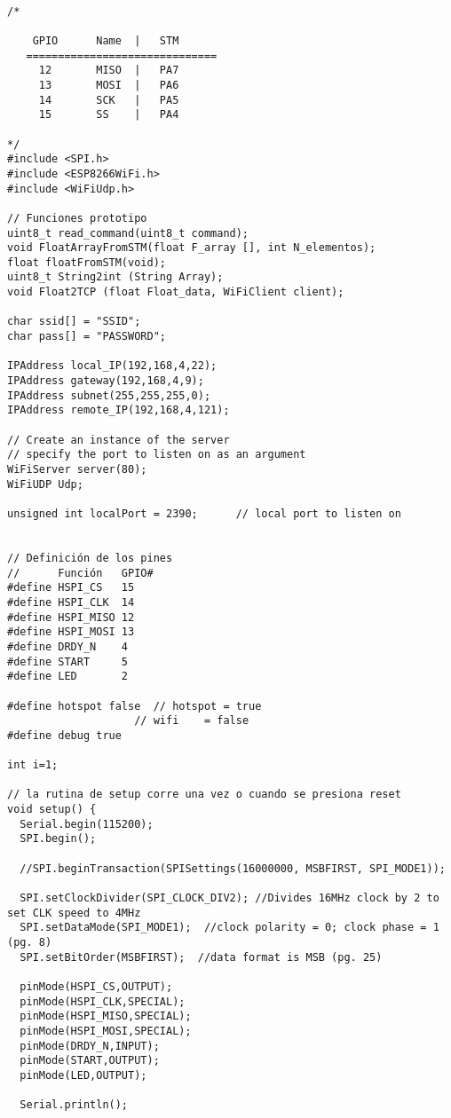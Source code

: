 \begin{lstlisting}[label=algoritmo:ESP:master_fast.ino,style = STM-code,frame=single,caption=ESP:master\_fast.ino]

/*

    GPIO      Name  |   STM
   ==============================
     12       MISO  |   PA7
     13       MOSI  |   PA6
     14       SCK   |   PA5
     15       SS    |   PA4

*/
#include <SPI.h>
#include <ESP8266WiFi.h>
#include <WiFiUdp.h>

// Funciones prototipo
uint8_t read_command(uint8_t command);
void FloatArrayFromSTM(float F_array [], int N_elementos);
float floatFromSTM(void);
uint8_t String2int (String Array);
void Float2TCP (float Float_data, WiFiClient client);

char ssid[] = "SSID";
char pass[] = "PASSWORD";    

IPAddress local_IP(192,168,4,22);
IPAddress gateway(192,168,4,9);
IPAddress subnet(255,255,255,0);
IPAddress remote_IP(192,168,4,121);

// Create an instance of the server
// specify the port to listen on as an argument
WiFiServer server(80);
WiFiUDP Udp;

unsigned int localPort = 2390;      // local port to listen on


// Definición de los pines
//      Función   GPIO#
#define HSPI_CS   15
#define HSPI_CLK  14 
#define HSPI_MISO 12 
#define HSPI_MOSI 13 
#define DRDY_N    4 
#define START     5 
#define LED       2 

#define hotspot false  // hotspot = true
                    // wifi    = false
#define debug true

int i=1;

// la rutina de setup corre una vez o cuando se presiona reset
void setup() {
  Serial.begin(115200);                
  SPI.begin();

  //SPI.beginTransaction(SPISettings(16000000, MSBFIRST, SPI_MODE1));

  SPI.setClockDivider(SPI_CLOCK_DIV2); //Divides 16MHz clock by 2 to set CLK speed to 4MHz
  SPI.setDataMode(SPI_MODE1);  //clock polarity = 0; clock phase = 1 (pg. 8)
  SPI.setBitOrder(MSBFIRST);  //data format is MSB (pg. 25)  
  
  pinMode(HSPI_CS,OUTPUT);
  pinMode(HSPI_CLK,SPECIAL);
  pinMode(HSPI_MISO,SPECIAL);
  pinMode(HSPI_MOSI,SPECIAL);
  pinMode(DRDY_N,INPUT);
  pinMode(START,OUTPUT);
  pinMode(LED,OUTPUT);

  Serial.println();


\end{lstlisting}
